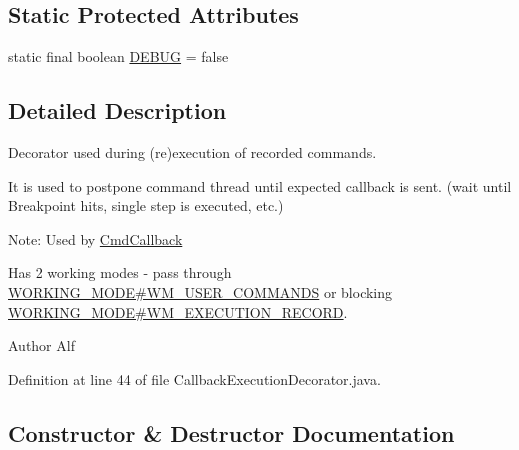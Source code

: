 \subsection*{Static Protected Attributes}
\begin{DoxyCompactItemize}
\item 
static final boolean \hyperlink{classgov_1_1nasa_1_1jpf_1_1inspector_1_1client_1_1_callback_execution_decorator_a28cdde5503944b9bff2957ae0dc55d16}{D\+E\+B\+UG} = false
\end{DoxyCompactItemize}


\subsection{Detailed Description}
Decorator used during (re)execution of recorded commands. 

It is used to postpone command thread until expected callback is sent. (wait until Breakpoint hits, single step is executed, etc.)

Note\+: Used by \hyperlink{}{Cmd\+Callback}

Has 2 working modes -\/ pass through \hyperlink{enumgov_1_1nasa_1_1jpf_1_1inspector_1_1client_1_1_callback_execution_decorator_1_1_w_o_r_k_i_n_g___m_o_d_e_ad92512bd45abad7bde4fdcb5e1daac49}{W\+O\+R\+K\+I\+N\+G\+\_\+\+M\+O\+D\+E\#\+W\+M\+\_\+\+U\+S\+E\+R\+\_\+\+C\+O\+M\+M\+A\+N\+DS} or blocking \hyperlink{enumgov_1_1nasa_1_1jpf_1_1inspector_1_1client_1_1_callback_execution_decorator_1_1_w_o_r_k_i_n_g___m_o_d_e_a44e57f52bc0befd4422026d3d2f35e7a}{W\+O\+R\+K\+I\+N\+G\+\_\+\+M\+O\+D\+E\#\+W\+M\+\_\+\+E\+X\+E\+C\+U\+T\+I\+O\+N\+\_\+\+R\+E\+C\+O\+RD}.

\begin{DoxyAuthor}{Author}
Alf 
\end{DoxyAuthor}


Definition at line 44 of file Callback\+Execution\+Decorator.\+java.



\subsection{Constructor \& Destructor Documentation}
